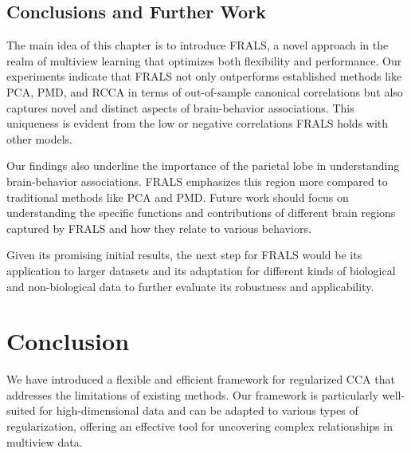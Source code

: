 \subsection{Conclusions and Further Work}
The main idea of this chapter is to introduce FRALS, a novel approach in the realm of multiview learning that optimizes
both flexibility and performance.
Our experiments indicate that FRALS not only outperforms established methods like PCA, PMD, and RCCA in terms of out-of-sample canonical correlations but also captures novel and distinct aspects of brain-behavior associations.
This uniqueness is evident from the low or negative correlations FRALS holds with other models.

Our findings also underline the importance of the parietal lobe in understanding brain-behavior associations.
FRALS emphasizes this region more compared to traditional methods like PCA and PMD. Future work should focus on understanding the specific functions and contributions of different brain regions captured by FRALS and how they relate to various behaviors.

Given its promising initial results, the next step for FRALS would be its application to larger datasets and its adaptation for different kinds of biological and non-biological data to further evaluate its robustness and applicability.



\section{Conclusion}

We have introduced a flexible and efficient framework for regularized CCA that addresses the limitations of existing methods.
Our framework is particularly well-suited for high-dimensional data and can be adapted to various types of regularization, offering an effective tool for uncovering complex relationships in multiview data.







